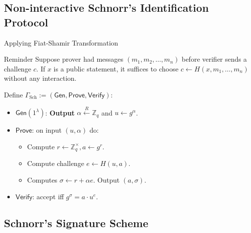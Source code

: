 \documentclass[xcolor={usenames,dvipsnames}]{beamer}
\begin{document}
    \subsection{Non-interactive Schnorr's Identification Protocol}
    \begin{frame}{Applying Fiat-Shamir Transformation}
        \begin{block}{Reminder}
            Suppose prover had messages $(m_1,m_2,\dots,m_n)$ before verifier sends a challenge $c$. If $x$ is a public statement, it suffices to choose $c \gets H(x,m_1,\dots,m_n)$ without any interaction.\pause
        \end{block}

        \begin{definition}
            Define $\Gamma_{\text{Sch}} := (\mathsf{Gen}, \mathsf{Prove}, \mathsf{Verify})$:\pause
            \begin{itemize}
                \item $\mathsf{Gen}(1^{\lambda})$: \textbf{Output} $\alpha \xleftarrow{R} \mathbb{Z}_q$ and $u \gets g^{\alpha}$.\pause
                \item $\mathsf{Prove}$: on input $(u,\alpha)$ do:
                \begin{itemize}
                    \item Compute $r \gets \mathbb{Z}_q^{\times}, a \gets g^{r}$.\pause
                    \item \textcolor{green!80!black}{Compute challenge $e \gets H(u, a)$.} \pause
                    \item Computes $\sigma \gets r + \alpha e$. Output $(a,\sigma)$.\pause
                \end{itemize}
                \item $\mathsf{Verify}$: accept iff $g^{\sigma} = a \cdot u^e$.
            \end{itemize}
        \end{definition}
    \end{frame}

    \subsection{Schnorr's Signature Scheme}
\end{document}
